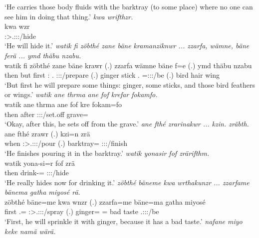 \begin{exe}
	\trans `He carries those body fluids with the barktray (to some place) where no one can see him in doing that thing.'
	\emph{kwa wrifthzr.}\\
	\gll kwa wzr\\
	{\Fut} \Stsg:\Sbj>\Tsg.\F:\Obj:\Nonpast:\Ipfv/hide\\
	\trans `He will hide it.'
	\emph{watik fi zöbthé zane bäne kramanziknwr ... zzarfa, wämne, bäne ferä ... ymd thäbu nzabu.}\\
	\gll watik fi zöbthé zane bäne krawr (.) zzarfa wämne bäne f=e (.) ymd thäbu nzabu\\
	then but first \Dem:{\Prox} \Recog.{\Abs} \Stsg:\Sbj:\Irr:\Ipfv/prepare (.) ginger stick \Recog.{\Abs} \Dist=\Stpl:\Sbj:\Nonpast:\Ipfv/be (.) bird hair wing\\
	\trans `But first he will prepare some things: ginger, some sticks, and those bird feathers or wings.'
	\emph{watik ane thrma ane fof krefar fokamfo.}\\
	\gll watik ane thrma ane fof kre fokam=fo\\
	then {\Dem} after {\Dem} {\Emph} \Stsg:\Sbj:\Irr:\Pfv/set.off grave=\All\\
	\trans `Okay, after this, he sets off from the grave.'
	\emph{ane fthé zrarinakwr ... kzin. zräbth.}\\
	\gll ane fthé zrawr (.) kzi=n zrä\\
	{\Dem} when \Stsg:\Sbj>\Tsg.\F:\Obj:\Irr:\Ipfv/pour (.) barktray={\Loc} \Stsg:\Sbj:\Irr:\Pfv/finish\\
	\trans `He finishes pouring it in the barktray.'
	\emph{watik yonasir fof zrärifthm.}\\
	\gll watik yona-si=r fof zrä\\
	then drink-\Nmlz={\Purp} {\Emph} \Stsg:\Sg:\Irr:\Pfv/hide\\
	\trans `He really hides now for drinking it.'
	\emph{zöbthé bäneme kwa wrthakunzr ... zzarfame bänema gatha miyosé rä.}\\
	\gll zöbthé bäne=me kwa wnzr (.) zzarfa=me bäne=ma gatha miyosé \\
	first \Recog.={\Ins} {\Fut} \Stsg:\Sbj>\Tsg.\F:\Obj:\Nonpast:\Ipfv/spray (.) ginger={\Ins} \Recog={\Char} bad taste \Tsg.\F:\Sbj:\Nonpast:\Ipfv/be\\
	\trans `First, he will sprinkle it with ginger, because it has a bad taste.'
	\emph{nafane miyo keke namä wärä.}\\

\end{exe}
